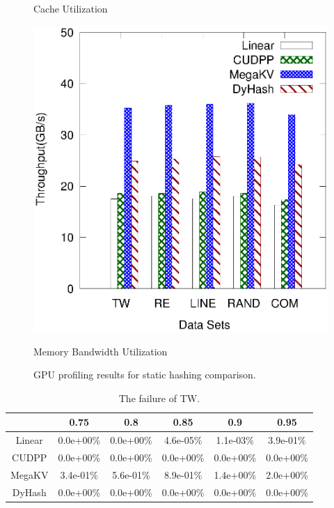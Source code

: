 \begin{figure}[h]
\begin{minipage}{0.3\linewidth}
	\centerline{Cache Utilization}
\end{minipage}
	\hfill
	\begin{minipage}{0.3\linewidth}\centering
	\includegraphics[width=\linewidth]{pic/static-profi/memory-read.eps}
	\centerline{Memory Bandwidth Utilization}
	\end{minipage}
	\caption{GPU profiling results for static hashing comparison.}
	\label{fig:static:profile}
\end{figure}



\begin{table}[H]
 	\caption{The failure of TW.}
	\centering
       \begin{tabular}{|c|c|c|c|c|c|}
		\hline
		       & 0.75 & 0.8 & 0.85 & 0.9 & 0.95\\ \hline
		Linear &0.0e+00\% & 0.0e+00\% &4.6e-05\%  & 1.1e-03\% & 3.9e-01\% \\ \hline
		CUDPP & 0.0e+00\% & 0.0e+00\% &0.0e+00\%  & 0.0e+00\% & 0.0e+00\% \\ \hline
		MegaKV & 3.4e-01\% & 5.6e-01\% &8.9e-01\%  & 1.4e+00\% & 2.0e+00\% \\ \hline
		DyHash &0.0e+00\% & 0.0e+00\% &0.0e+00\%  & 0.0e+00\% & 0.0e+00\% \\ \hline
	\end{tabular}
	\label{tab:fail:tw}
\end{table}

